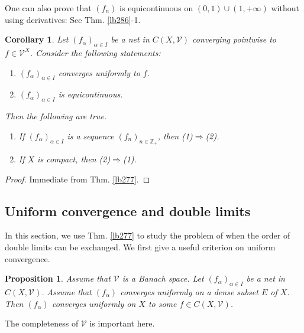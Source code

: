 \documentclass[12pt,b5paper,notitlepage]{article}
\theoremstyle{definition}
\theoremstyle{plain}
\newtheorem{pp}[df]{Proposition}
\newtheorem{co}[df]{Corollary}
\newcommand{\mc}{\mathcal}
\newcommand{\Zbb}{\mathbb Z}
\numberwithin{equation}{section}
\begin{document}
One can also prove that $(f_n)$ is equicontinuous on $(0,1)\cup(1,+\infty)$ without using derivatives: See Thm. \ref{lb286}-1.





\begin{co}\label{lb284}
Let $(f_\alpha)_{\alpha\in I}$ be a net in $C(X,\mc V)$ converging pointwise to $f\in\mc V^X$. Consider the following statements:
\begin{enumerate}[label=(\arabic*)]
\item $(f_\alpha)_{\alpha\in I}$ converges uniformly to $f$.
\item $(f_\alpha)_{\alpha\in I}$ is equicontinuous.
\end{enumerate}
Then the following are true.
\begin{enumerate}
\item If $(f_\alpha)_{\alpha\in I}$ is a sequence $(f_n)_{n\in\Zbb_+}$, then (1)$\Rightarrow$(2).
\item If $X$ is compact, then (2)$\Rightarrow$(1).
\end{enumerate}
\end{co}


\begin{proof}
Immediate from Thm. \ref{lb277}.
\end{proof}









\subsection{Uniform convergence and double limits}



In this section, we use Thm. \ref{lb277} to study the problem of when the order of double limits can be exchanged. We first give a useful criterion on uniform convergence.


\begin{pp}\label{lb288}
Assume that $\mc V$ is a Banach space. Let $(f_\alpha)_{\alpha\in I}$ be a net in $C(X,\mc V)$. Assume that $(f_\alpha)$ converges uniformly on a dense subset $E$ of $X$. Then $(f_\alpha)$ converges uniformly on $X$ to some $f\in C(X,\mc V)$.
\end{pp}

The completeness of $\mc V$ is important here.
\end{document}
